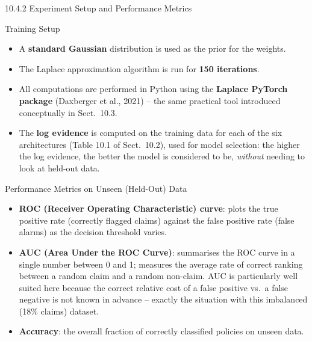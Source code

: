 \documentclass[aspectratio=169,10pt]{beamer}
\begin{document}
\begin{frame}[allowframebreaks]{10.4.2 Experiment Setup and Performance Metrics}

  \begin{block}{Training Setup}
    \begin{itemize}
      \item A \textbf{standard Gaussian} distribution is used as the prior
        for the weights.
      \item The Laplace approximation algorithm is run for \textbf{150
        iterations}.
      \item All computations are performed in Python using the
        \textbf{Laplace PyTorch package} (Daxberger et al., 2021) -- the
        same practical tool introduced conceptually in Sect.\ 10.3.
      \item The \textbf{log evidence} is computed on the training data for
        each of the six architectures (Table 10.1 of Sect.\ 10.2), used for
        model selection: the higher the log evidence, the better the model
        is considered to be, \emph{without} needing to look at held-out
        data.
    \end{itemize}
  \end{block}

  \begin{block}{Performance Metrics on Unseen (Held-Out) Data}
    \begin{itemize}
      \item \textbf{ROC (Receiver Operating Characteristic) curve}: plots
        the true positive rate (correctly flagged claims) against the false
        positive rate (false alarms) as the decision threshold varies.
      \item \textbf{AUC (Area Under the ROC Curve)}: summarises the ROC
        curve in a single number between 0 and 1; measures the average rate
        of correct ranking between a random claim and a random non-claim.
        AUC is particularly well suited here because the correct relative
        cost of a false positive vs.\ a false negative is not known in
        advance -- exactly the situation with this imbalanced (18\% claims)
        dataset.
      \item \textbf{Accuracy}: the overall fraction of correctly classified
        policies on unseen data.
    \end{itemize}
  \end{block}

\end{frame}
\end{document}
